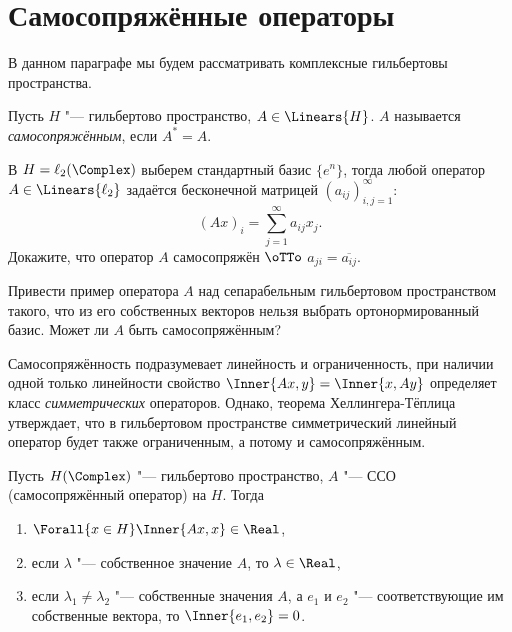 \documentclass[main]{subfiles}
\begin{document}
\section{Самосопряжённые операторы}%

В данном параграфе мы будем рассматривать
комплексные гильбертовы пространства.

\begin{definition}
  Пусть $H$ "--- гильбертово пространство,
  $A \in \Linears{H}$. $A$ называется
  \emph{самосопряжённым}, если $A^* = A$.
\end{definition}

\begin{exercise}
  В \( H = \ell_2(\Complex) \)
  выберем стандартный базис \( \{ e^n \} \),
  тогда любой оператор \( A \in \Linears{\ell_2} \)
  задаётся бесконечной матрицей
  \( (a_{ij})_{i,j=1}^{\infty} \):
  \[
    (Ax)_i = \sum_{j=1}^\infty a_{ij} x_j.
  \]
  Докажите, что
  оператор \( A \) самосопряжён \( \oTTo \)
  \( a_{ji} = \overline{a_{ij}} \).
\end{exercise}

\begin{exercise}
  Привести пример оператора \( A \)
  над сепарабельным гильбертовом пространством такого,
  что из его собственных векторов нельзя выбрать
  ортонормированный базис.
  Может ли \( A \) быть самосопряжённым?
\end{exercise}

\begin{remark}
  Самосопряжённость подразумевает линейность и ограниченность,
  при наличии одной только линейности
  свойство $\Inner{Ax, y} = \Inner{x, Ay}$ определяет класс
  \emph{симметрических} операторов.
  Однако, теорема Хеллингера-Тёплица утверждает,
  что в гильбертовом пространстве
  симметрический линейный оператор будет также ограниченным,
  а потому и самосопряжённым.
\end{remark}

\begin{theorem}%
  Пусть \( H(\Complex) \) "--- гильбертово пространство,
  \( A \) "--- ССО
  (самосопряжённый оператор) на \( H \). Тогда
  \begin{enumerate}
    \item \( \Forall{x \in H} \Inner{Ax, x} \in \Real \),
    \item если \( \lambda \) "--- собственное значение \( A \),
      то \( \lambda \in \Real \),
    \item если \( \lambda_1 \ne \lambda_2 \) "---
      собственные значения \( A \),
      а \( e_1 \) и \( e_2 \) "--- соответствующие им
      собственные вектора, то \( \Inner{e_1, e_2} = 0 \).
  \end{enumerate}
\end{theorem}
\end{document}
